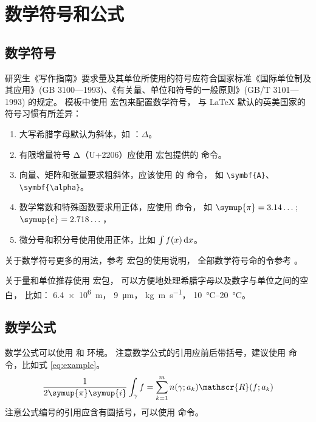 
\chapter{数学符号和公式}

\section{数学符号}

研究生《写作指南》要求量及其单位所使用的符号应符合国家标准《国际单位制及其应用》(GB 3100—1993)、《有关量、单位和符号的一般原则》(GB/T 3101—1993) 的规定。
模板中使用  宏包来配置数学符号，
与 \LaTeX{} 默认的英美国家的符号习惯有所差异：
\begin{enumerate}
  \item 大写希腊字母默认为斜体，如 ：$\Delta$。
  \item 有限增量符号 $\increment$（U+2206）应使用  宏包提供的
     命令。
  \item 向量、矩阵和张量要求粗斜体，应该使用  的  命令，
    如 \verb|\symbf{A}|、\verb|\symbf{\alpha}|。
  \item 数学常数和特殊函数要求用正体，应使用  命令，
    如 $\symup{\pi} = 3.14\dots$; $\symup{e} = 2.718\dots$，
  \item 微分号和积分号使用使用正体，比如 $\int f(x) \mathop{}\!\mathrm{d} x$。
\end{enumerate}

关于数学符号更多的用法，参考
\href{http://mirrors.ctan.org/macros/latex/contrib/unicode-math/unicode-math.pdf}{}
宏包的使用说明，
全部数学符号命的令参考
\href{http://mirrors.ctan.org/macros/latex/contrib/unicode-math/unimath-symbols.pdf}{}。

关于量和单位推荐使用
\href{http://mirrors.ctan.org/macros/latex/contrib/siunitx/siunitx.pdf}{}
宏包，
可以方便地处理希腊字母以及数字与单位之间的空白，
比如：
\SI{6.4e6}{m}，
\SI{9}{\micro\meter}，
\si{kg.m.s^{-1}}，
\SIrange{10}{20}{\degreeCelsius}。



\section{数学公式}

数学公式可以使用  和  环境。
注意数学公式的引用应前后带括号，建议使用  命令，比如式 \eqref{eq:example}。
\begin{equation}
  \frac{1}{2 \symup{\pi} \symup{i}} \int_\gamma f = \sum_{k=1}^m n(\gamma; a_k) \mathscr{R}(f; a_k)
  \label{eq:example}
\end{equation}
注意公式编号的引用应含有圆括号，可以使用  命令。

